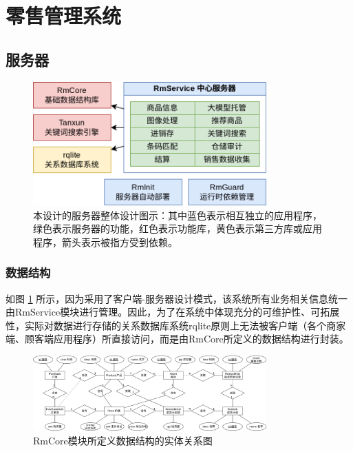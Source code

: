 \newpage
\section{零售管理系统}
\label{sec:foundation}

\subsection{服务器}

\begin{figure}[htbp]
	\centering
	\includegraphics[width=0.8\textwidth]{./imgs/arch-server.png}
	\caption{本设计的服务器整体设计图示：其中蓝色表示相互独立的应用程序，绿色表示服务器的功能，红色表示功能库，黄色表示第三方库或应用程序，箭头表示被指方受到依赖。}
	\label{fig:arch-server}
\end{figure}

\subsubsection{数据结构}
如图 \ref{fig:arch-server} 所示，因为采用了客户端-服务器设计模式，该系统所有业务相关信息统一由RmService模块进行管理。因此，为了在系统中体现充分的可维护性、可拓展性，实际对数据进行存储的关系数据库系统rqlite原则上无法被客户端（各个商家端、顾客端应用程序）所直接访问，而是由RmCore所定义的数据结构进行封装。

\begin{figure}[htbp]
	\centering
	\includegraphics[width=0.8\textwidth]{./imgs/rms-er-rmcore.png}
	\caption{RmCore模块所定义数据结构的实体关系图}
	\label{fig:rms-er-rmcore}
\end{figure}


